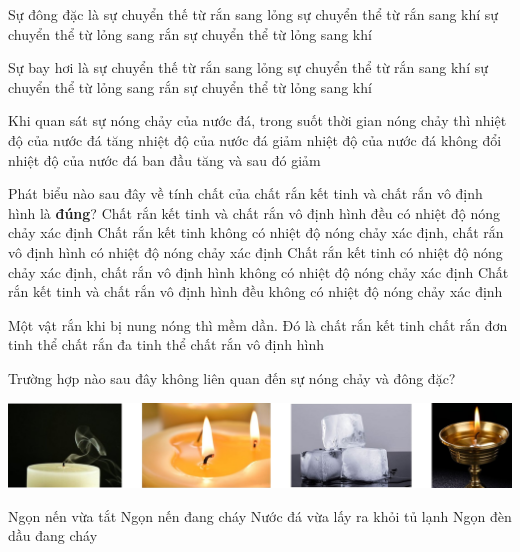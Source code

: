 \begin{ex}
Sự đông đặc là
\choice
{ sự chuyển thế từ rắn sang lỏng}
{ sự chuyển thể từ rắn sang khí}
{\True sự chuyển thể từ lỏng sang rắn}
{ sự chuyển thể từ lỏng sang khí}
\end{ex}
\begin{ex}
Sự bay hơi là
\choice
{ sự chuyển thế từ rắn sang lỏng}
{ sự chuyển thể từ rắn sang khí}
{ sự chuyển thể từ lỏng sang rắn}
{\True sự chuyển thể từ lỏng sang khí}
\end{ex}
\begin{ex}
Khi quan sát sự nóng chảy của nước đá, trong suốt thời gian nóng chảy thì
\choice
{ nhiệt độ của nước đá tăng}
{ nhiệt độ của nước đá giảm}
{\True nhiệt  độ của nước đá không đổi}
{ nhiệt độ của nước đá ban đầu tăng và sau đó giảm}
\end{ex}
\begin{ex}
Phát biểu nào sau đây về tính chất của chất rắn kết tinh và chất rắn vô định hình là \textbf{đúng}?
\choice
{ Chất rắn kết tinh và chất rắn vô định hình đều có nhiệt độ nóng chảy xác định}
{ Chất rắn kết tinh không có nhiệt độ nóng chảy xác định, chất rắn vô định hình có nhiệt độ nóng chảy xác định}
{\True Chất rắn kết tinh có nhiệt độ nóng chảy xác định, chất rắn vô định hình không có nhiệt độ nóng chảy xác định}
{ Chất rắn kết tinh và chất rắn vô định hình đều không có nhiệt độ nóng chảy xác định}
\end{ex}
\begin{ex}
Một vật rắn khi bị nung nóng thì mềm dần. Đó là
\choice
{ chất rắn kết tinh}
{ chất rắn đơn tinh thể}
{ chất rắn đa tinh thể}
{\True chất rắn vô định hình}
\end{ex}
\begin{ex}
Trường hợp nào sau đây không liên quan đến sự nóng chảy và đông đặc?
	\begin{center}
		\includegraphics[width=0.45\linewidth]{figs/VN12-Y24-PH-SYL-001P-2}
	\end{center}
\choice
{ Ngọn nến vừa tắt}
{ Ngọn nến đang cháy}
{ Nước đá vừa lấy ra khỏi tủ lạnh}
{\True Ngọn đèn dầu đang cháy}
\end{ex}
